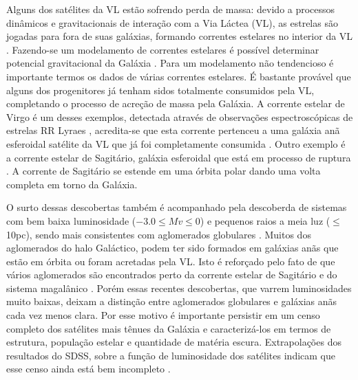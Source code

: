 \documentclass[
	12pt,				%
	openany,			%
	oneside,			%
	a4paper,			%
	english,			%
	brazil				%
	]{abntex2}
\begin{document}
Alguns dos satélites da VL estão sofrendo perda de massa:  devido a processos dinâmicos e gravitacionais de interação com a Via Láctea (VL), as estrelas são jogadas para fora de suas galáxias, formando correntes estelares no interior da VL \cite{1991ApJ...379...52W}. Fazendo-se um modelamento de correntes estelares é possível determinar potencial gravitacional da Galáxia \cite{2014ApJ...795...94B} . Para um modelamento não tendencioso é importante termos os dados de várias correntes estelares. É bastante provável que alguns dos progenitores já tenham sidos totalmente consumidos pela VL, completando o processo de acreção de massa pela Galáxia. A corrente estelar de Virgo é um desses exemplos, detectada através de observações espectroscópicas de estrelas RR Lyraes \cite{2006RMxAC..26...70D}, acredita-se que esta corrente pertenceu a  uma galáxia anã esferoidal satélite da VL que já foi completamente consumida \cite{2012ApJ...753..145C}. Outro exemplo é a corrente estelar de Sagitário, galáxia esferoidal que está em processo de ruptura \cite{2001ApJ...547L.133I}. A corrente de Sagitário se estende  em  uma órbita polar dando uma volta completa em torno da Galáxia. \par

O surto dessas descobertas também é acompanhado pela descoberda de sistemas com bem baixa luminosidade ($-3.0 \le Mv \le 0$) e pequenos raios a meia luz ($\le$ 10pc), sendo mais consistentes com aglomerados globulares \cite{2007ApJ...669..337K,2010ApJ...712L.103B, 2011AJ....142...88F,2013ApJ...767..101B}.  Muitos dos aglomerados do halo Galáctico, podem ter sido formados em galáxias anãs que estão em órbita ou foram acretadas pela VL. Isto é reforçado pelo fato de que vários aglomerados são encontrados perto da corrente estelar de Sagitário e do sistema magalânico \cite{2010ApJ...718.1128L,2015MNRAS.453.3568D}.  Porém essas recentes descobertas, que varrem luminosidades muito baixas, deixam a distinção entre aglomerados globulares e galáxias anãs cada vez menos clara. Por esse motivo é importante persistir em um censo completo dos satélites mais tênues da Galáxia e caracterizá-los em termos de estrutura, população estelar e quantidade de matéria escura. Extrapolações dos resultados do SDSS, sobre a função de luminosidade dos satélites indicam que esse censo ainda está bem incompleto \cite{2008ApJ...688..277T, 2014ApJ...795L..13H}. \par 
\end{document}
